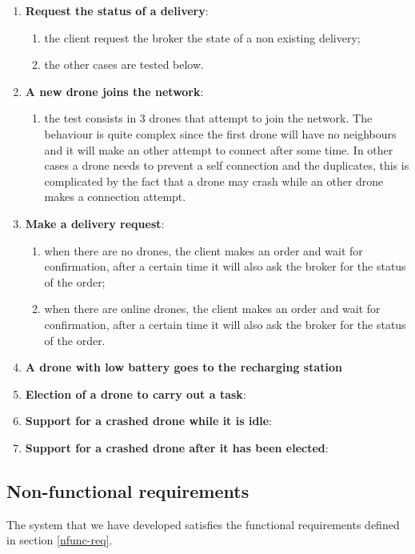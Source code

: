 \documentclass[a4paper, oneside]{memoir}
\begin{document}
\begin{enumerate}
\item \textbf{Request the status of a delivery}:
	\begin{enumerate}
	\item the client request the broker the state of a non existing delivery;
	\item the other cases are tested below.
	\end{enumerate}

\item \textbf{A new drone joins the network}:
	\begin{enumerate}
	\item the test consists in 3 drones that attempt to join the network. The behaviour is quite complex since the first drone will have no neighbours and it will make an other attempt to connect after some time. In other cases a drone needs to prevent a self connection and the duplicates, this is complicated by the fact that a drone may crash while an other drone makes a connection attempt.
	\end{enumerate}

\item \textbf{Make a delivery request}:
	\begin{enumerate}
	\item when there are no drones, the client makes an order and wait for confirmation, after a certain time it will also ask the broker for the status of the order;
	\item when there are online drones, the client makes an order and wait for confirmation, after a certain time it will also ask the broker for the status of the order.
	\end{enumerate}

\item \textbf{A drone with low battery goes to the recharging station}
\item \textbf{Election of a drone to carry out a task}:

\item \textbf{Support for a crashed drone while it is idle}:
\item \textbf{Support for a crashed drone after it has been elected}:

\end{enumerate}

\subsection{Non-functional requirements}
The system that we have developed satisfies the functional requirements defined in section \ref{nfunc-req}.
\end{document}
